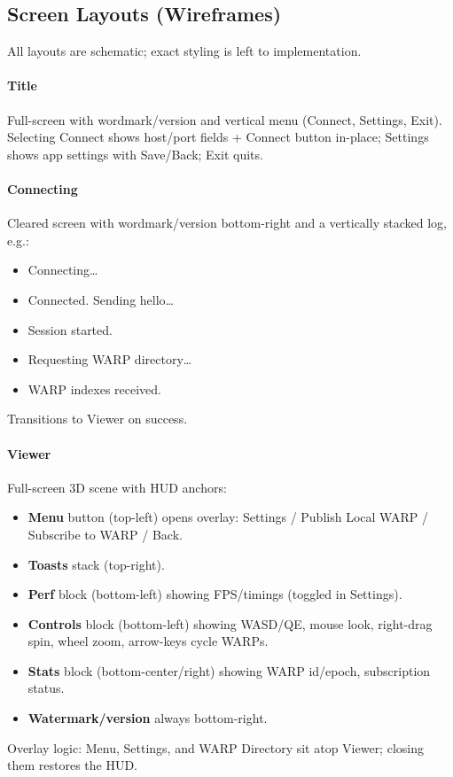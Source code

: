 \subsection{Screen Layouts (Wireframes)}
All layouts are schematic; exact styling is left to implementation.

\paragraph{Title}
Full-screen with wordmark/version and vertical menu (Connect, Settings, Exit). Selecting Connect shows host/port fields + Connect button in-place; Settings shows app settings with Save/Back; Exit quits.

\paragraph{Connecting}
Cleared screen with wordmark/version bottom-right and a vertically stacked log, e.g.:
\begin{itemize}
  \item Connecting\ldots
  \item Connected. Sending hello\ldots
  \item Session started.
  \item Requesting WARP directory\ldots
  \item WARP indexes received.
\end{itemize}
Transitions to Viewer on success.

\paragraph{Viewer}
Full-screen 3D scene with HUD anchors:
\begin{itemize}
  \item \textbf{Menu} button (top-left) opens overlay: Settings / Publish Local WARP / Subscribe to WARP / Back.
  \item \textbf{Toasts} stack (top-right).
  \item \textbf{Perf} block (bottom-left) showing FPS/timings (toggled in Settings).
  \item \textbf{Controls} block (bottom-left) showing WASD/QE, mouse look, right-drag spin, wheel zoom, arrow-keys cycle WARPs.
  \item \textbf{Stats} block (bottom-center/right) showing WARP id/epoch, subscription status.
  \item \textbf{Watermark/version} always bottom-right.
\end{itemize}
Overlay logic: Menu, Settings, and WARP Directory sit atop Viewer; closing them restores the HUD.


